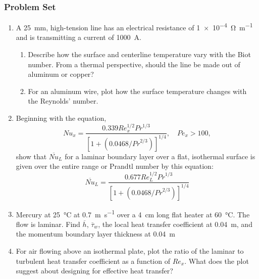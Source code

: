 \documentclass[12pt,letterpaper]{article}
\begin{document}
\subsubsection*{Problem Set}
\begin{enumerate}

    \item A \SI{25}{\milli\meter}, high-tension line has an electrical resistance of \SI{1e-4}{\ohm\per\meter} and is transmitting a current of \SI{1000}{\ampere}.
    \begin{enumerate}
        \item Describe how the surface and centerline temperature vary with the Biot number.
            From a thermal perspective, should the line be made out of aluminum or copper?
        \item For an aluminum wire, plot how the surface temperature changes with the Reynolds' number.
    \end{enumerate}
    
    \item Beginning with the equation,
    \begin{equation*}
        \mathit{Nu}_x = \frac{0.339 \mathit{Re}_x^{1/2} \mathit{Pr}^{1/3}}{\left[ 1 + \left( 0.0468 / \mathit{Pr}^{2/3} \right) \right]^{1/4}}, \quad \mathit{Pe}_x > 100,
    \end{equation*}
        show that $\overline{\mathit{Nu}}_L$ for a laminar boundary layer over a flat, isothermal surface is given over the entire range or Prandtl number by this equation:
        \begin{equation*}
            \overline{\mathit{Nu}}_L = \frac{0.677 \mathit{Re}_L^{1/2} \mathit{Pr}^{1/3}}{\left[ 1 + \left( 0.0468 / \mathit{Pr}^{2/3} \right) \right]^{1/4}}
        \end{equation*}

    \item Mercury at \SI{25}{\celsius} at \SI{0.7}{\meter\per\second} over a \SI{4}{\centi\meter} long flat heater at \SI{60}{\celsius}.
        The flow is laminar.
        Find $\overline{h}$, $\overline{\tau}_w$, the local heat transfer coefficient at \SI{0.04}{\meter}, and the momentum boundary layer thickness at \SI{0.04}{\meter}
    
    \item For air flowing above an isothermal plate, plot the ratio of the laminar to turbulent heat transfer coefficient as a function of $\mathit{Re}_x$.
        What does the plot suggest about designing for effective heat transfer?
    

\end{enumerate}
\end{document}

